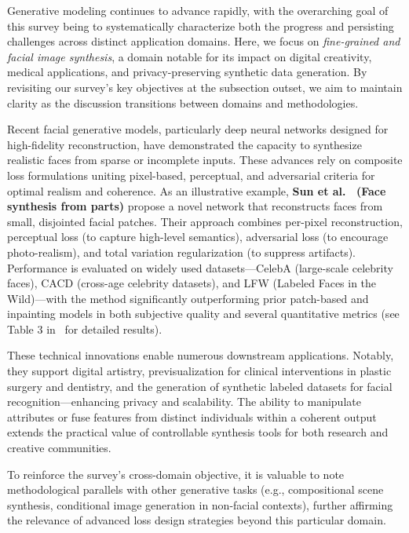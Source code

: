 \documentclass[sigconf]{acmart}
\begin{document}
Generative modeling continues to advance rapidly, with the overarching goal of this survey being to systematically characterize both the progress and persisting challenges across distinct application domains. Here, we focus on \emph{fine-grained and facial image synthesis}, a domain notable for its impact on digital creativity, medical applications, and privacy-preserving synthetic data generation. By revisiting our survey's key objectives at the subsection outset, we aim to maintain clarity as the discussion transitions between domains and methodologies.

Recent facial generative models, particularly deep neural networks designed for high-fidelity reconstruction, have demonstrated the capacity to synthesize realistic faces from sparse or incomplete inputs. These advances rely on composite loss formulations uniting pixel-based, perceptual, and adversarial criteria for optimal realism and coherence. As an illustrative example, \textbf{Sun et al.~\cite{ref97} (Face synthesis from parts)} propose a novel network that reconstructs faces from small, disjointed facial patches. Their approach combines per-pixel reconstruction, perceptual loss (to capture high-level semantics), adversarial loss (to encourage photo-realism), and total variation regularization (to suppress artifacts). Performance is evaluated on widely used datasets—CelebA (large-scale celebrity faces), CACD (cross-age celebrity datasets), and LFW (Labeled Faces in the Wild)—with the method significantly outperforming prior patch-based and inpainting models in both subjective quality and several quantitative metrics (see Table 3 in~\cite{ref97} for detailed results).

These technical innovations enable numerous downstream applications. Notably, they support digital artistry, previsualization for clinical interventions in plastic surgery and dentistry, and the generation of synthetic labeled datasets for facial recognition—enhancing privacy and scalability. The ability to manipulate attributes or fuse features from distinct individuals within a coherent output extends the practical value of controllable synthesis tools for both research and creative communities.

To reinforce the survey's cross-domain objective, it is valuable to note methodological parallels with other generative tasks (e.g., compositional scene synthesis, conditional image generation in non-facial contexts), further affirming the relevance of advanced loss design strategies beyond this particular domain.
\end{document}
